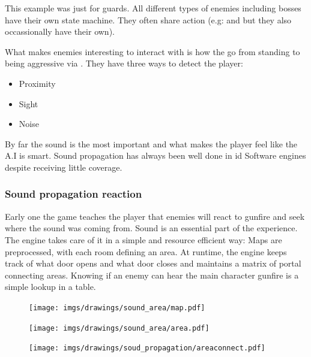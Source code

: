 \par
\begin{minipage}{\textwidth}

\end{minipage}
\par
This example was just for guards. All different types of enemies including bosses have their own state machine. They often share action (e.g:  and  but they also occassionally have their own).\\

\par
What makes enemies interesting to interact with is how the go from standing to being aggressive via . They have three ways to detect the player:\\
\begin{itemize}
\item Proximity
\item Sight
\item Noise
\end{itemize}
By far the sound is the most important and what makes the player feel like the A.I is smart. Sound propagation has always been well done in id Software engines despite receiving little coverage.





\subsubsection{Sound propagation reaction}
Early one the game teaches the player that enemies will react to gunfire and seek where the sound was coming from. Sound is an essential part of the experience. The engine takes care of it in a simple and resource efficient way: Maps are preprocessed, with each room defining an area. At runtime, the engine keeps track of what door opens and what door closes and maintains a matrix of portal connecting areas.
Knowing if an enemy can hear the main character gunfire is a simple lookup in a table.

\par
\begin{figure}[H]
 \centering
 \texttt{[image: imgs/drawings/sound\_area/map.pdf]}
\end{figure}
\par

\par
\begin{figure}[H]
 \centering
 \texttt{[image: imgs/drawings/sound\_area/area.pdf]}
\end{figure}
\par
\par
\begin{figure}[H]
 \centering
 \texttt{[image: imgs/drawings/soud\_propagation/areaconnect.pdf]}
\end{figure}
\par

